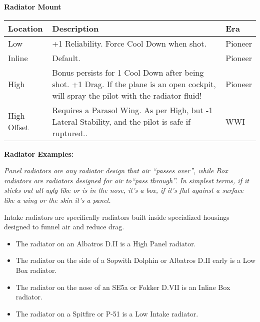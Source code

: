 \documentclass{article}
\begin{document}
\textbf{Radiator Mount}

\begin{tabular}{|l|l|l|}
    \hline
    Location                                       & Description                                                      & Era     \\\hline
    Low                                            & +1 Reliability. Force Cool Down when shot.                       & Pioneer \\\hline
    Inline                                         & Default.                                                         & Pioneer \\\hline
    High                                           & Bonus persists for 1 Cool Down after being shot. +1 Drag. If the
    plane is an open cockpit, will spray the pilot with the radiator fluid!
                                                   & Pioneer                                                                    \\\hline
    High Offset                                    & Requires a Parasol Wing. As per High, but -1 Lateral
    Stability, and the pilot is safe if ruptured.. & WWI                                                                        \\\hline
\end{tabular}

\textbf{Radiator Examples: }

\emph{Panel radiators are any radiator design that air
    ``passes over'', while Box radiators are
    radiators designed for air to``pass
    through''. In simplest terms, if it sticks out all ugly
    like or is in the nose, it's a box, if
    it's flat against a surface like a wing
    or the skin it's a panel.}

Intake radiators are specifically radiators built inside
specialized housings designed to funnel air and reduce drag.

\begin{itemize}
    \item          The radiator on an Albatros D.II is a High Panel radiator.
    \item          The radiator on the side of a Sopwith Dolphin or Albatros D.II
          early is a Low Box radiator.
    \item          The radiator on the nose of an SE5a or Fokker D.VII is an
          Inline Box radiator.
    \item          The radiator on a Spitfire or P-51 is a Low Intake radiator.
\end{itemize}
\end{document}

